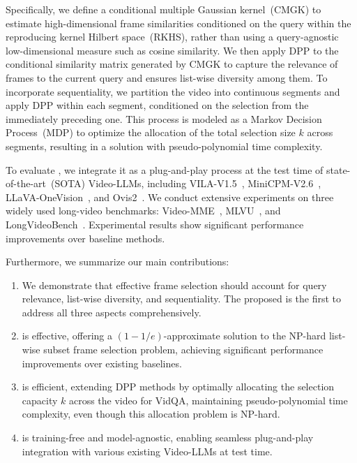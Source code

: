 Specifically, we define a conditional multiple Gaussian kernel~(CMGK) to estimate high-dimensional frame similarities conditioned on the query within the reproducing kernel Hilbert space~(RKHS), rather than using a query-agnostic low-dimensional measure such as cosine similarity. 
We then apply DPP to the conditional similarity matrix generated by CMGK to capture the relevance of frames to the current query and ensures list-wise diversity among them. 
To incorporate sequentiality, we partition the video into continuous segments and apply DPP within each segment, conditioned on the selection from the immediately preceding one.
This process is modeled as a Markov Decision Process~(MDP) to optimize the allocation of the total selection size $k$ across segments, resulting in a solution with pseudo-polynomial time complexity.


To evaluate \mname{}, we integrate it as a plug-and-play process at the test time of state-of-the-art~(SOTA) Video-LLMs, including VILA-V1.5~\cite{lin2024vila}, MiniCPM-V2.6~\cite{yao2024minicpm}, LLaVA-OneVision~\cite{li2024llava}, and Ovis2~\cite{ovis2}.
We conduct extensive experiments on three widely used long-video benchmarks: Video-MME~\cite{fu2024video}, MLVU~\cite{MLVU}, and LongVideoBench~\cite{wu2024longvideobench}.
Experimental results show significant performance improvements over baseline methods. 


Furthermore, we summarize our main contributions:
\begin{enumerate}
    \item We demonstrate that effective frame selection should account for query relevance, list-wise diversity, and sequentiality. The proposed \mname{} is the first to address all three aspects comprehensively.
    \item \mname{} is effective, offering a \((1-1/e)\)-approximate solution to the NP-hard list-wise subset frame selection problem, achieving significant performance improvements over existing baselines.
    \item \mname{} is efficient, extending DPP methods by optimally allocating the selection capacity \(k\) across the video for VidQA, maintaining pseudo-polynomial time complexity, even though this allocation problem is NP-hard.
    \item \mname{} is training-free and model-agnostic, enabling seamless plug-and-play integration with various existing Video-LLMs at test time.
\end{enumerate}





